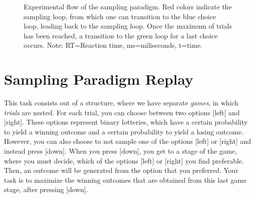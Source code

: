 \documentclass[12pt, oneside]{scrartcl}
\begin{document}
\begin{figure}[h!]
\begin{center}
{
} %

\captionsetup{width=.9\linewidth, format=plain}
\caption[Flow Sampling Paradigm]{Experimental flow of the sampling paradigm. Red colors indicate the sampling loop, from which one can transition to the blue choice loop, leading back to the sampling loop. Once the maximum of trials has been reached, a transition to the green loop for a last choice occurs. Note: RT=Reaction time, ms=miliseconds, t=time. }
\label{fig:spFlow}
\end{center}
\end{figure}


\pagebreak
\section{Sampling Paradigm Replay}

This task consists out of a structure, where we have separate \textit{games}, in which \textit{trials} are nested. For each trial, you can choose between two options [left] and [right]. These options represent binary lotteries, which have a certain probability to yield a winning outcome and a certain probability to yield a losing outcome. \\

However, you can also choose to not sample one of the options [left] or [right] and instead press [down]. When you press [down], you get to a stage of the game, where you must decide, which of the options [left] or [right] you find preferable. Then, an outcome will be generated from the option that you preferred. Your task is to maximize the winning outcomes that are obtained from this last game stage, after pressing [down]. \\
\end{document}
